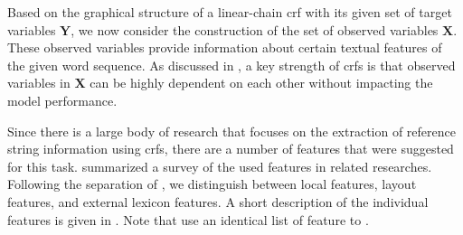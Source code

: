 Based on the graphical structure of a \gls{linear-chain crf} with its given set of \glspl{target variable} $\mathbf{Y}$, we now consider the construction of the set of \glspl{observed variable} $\mathbf{X}$.
These \glspl{observed variable} provide information about certain textual features of the given word sequence.
As discussed in , a key strength of \glspl{crf} is that \glspl{observed variable} in $\mathbf{X}$ can be highly dependent on each other without impacting the model performance.

Since there is a large body of research that focuses on the extraction of reference string information using \glspl{crf}, there are a number of features that were suggested for this task.
 summarized a survey of the used features in related researches.
Following the separation of \citet{peng2004accurate}, we distinguish between local features, layout features, and external lexicon features.
A short description of the individual features is given in .
Note that \citet{wu2014citeseerx} use an identical list of feature to \citet{councill2008parscit}.

\bigskip

